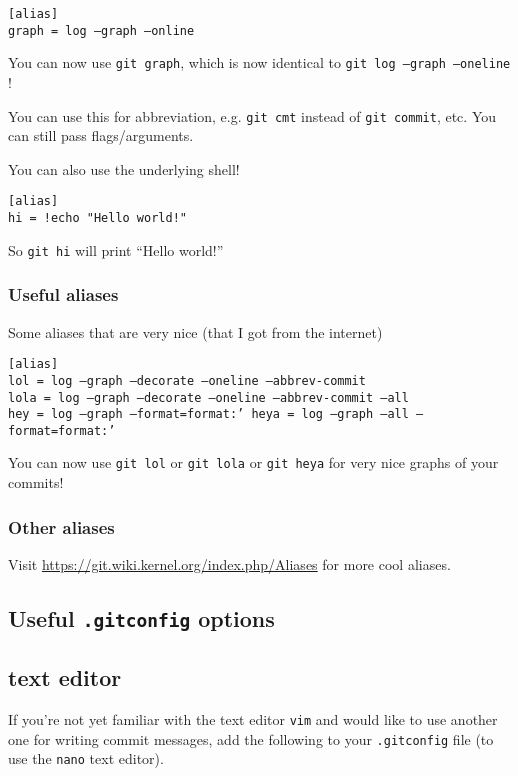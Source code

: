 \documentclass[12pt]{article}
\begin{document}
\texttt{[alias]\\
graph = log --graph --online
}

You can now use \texttt{git graph}, which is now identical to \texttt{git log --graph --oneline} !

You can use this for abbreviation, e.g. \texttt{git cmt} instead of \texttt{git commit}, etc. You can still pass flags/arguments.

You can also use the underlying shell!

\texttt{[alias]\\
hi = !echo "Hello world!"
}

So \texttt{git hi} will print ``Hello world!''


\subsubsection{Useful aliases}
Some aliases that are very nice (that I got from the internet)

\texttt{[alias]\\
lol = log --graph --decorate --oneline --abbrev-commit\\
lola = log --graph --decorate --oneline --abbrev-commit --all\\
hey = log --graph --format=format:'%
heya = log --graph --all --format=format:'%
}

You can now use \texttt{git lol} or \texttt{git lola} or \texttt{git heya} for very nice graphs of your commits!

\subsubsection{Other aliases}
Visit \url{https://git.wiki.kernel.org/index.php/Aliases} for more cool aliases.
\subsection{Useful \texttt{.gitconfig} options}

\subsection{text editor}
If you're not yet familiar with the text editor \texttt{vim} and would like to use another one for writing commit messages, add the following to your \texttt{.gitconfig} file (to use the \texttt{nano} text editor).
\end{document}
